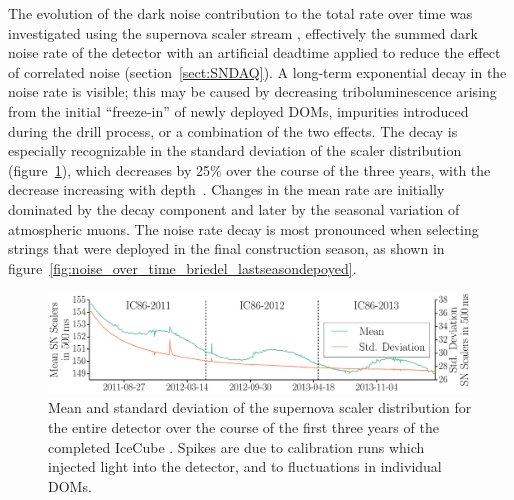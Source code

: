 The evolution of the dark noise contribution to the total rate over time was investigated using the
supernova scaler stream \cite{IC3:supernova, briedel_phd}, effectively 
the summed dark noise rate of the detector with an artificial deadtime
applied to reduce the effect of correlated noise
(section~\ref{sect:SNDAQ}). A long-term exponential decay in 
the noise rate is visible; this may be caused by 
decreasing triboluminescence \cite{ice_tribo} arising from the initial ``freeze-in''
of newly deployed DOMs, impurities introduced during the drill
process, or a combination of the two effects.  The decay
is especially recognizable in the standard deviation of the scaler
distribution (figure~\ref{fig:noise_over_time_briedel}), which decreases by
25\% over the course of the three years, with the decrease increasing with
depth~\cite{Piegsa09}. Changes in the mean rate are
initially dominated by the decay component and later by the seasonal
variation of atmospheric muons. The noise
rate decay is most pronounced when selecting strings
that were deployed in the final construction season, as shown in
figure~\ref{fig:noise_over_time_briedel_lastseasondepoyed}.


\begin{figure}[!h]
 \centering
 \includegraphics[width=1.0\textwidth]{graphics/dom/performance/darknoise/SN_Scalers_Whole_Detector_Mean_Variance_IC86_2011_2012_2013_smaller_height.pdf}
 \caption{Mean and standard deviation of the supernova scaler distribution for the
   entire detector over the course of the first three years of the
   completed IceCube \cite{briedel_phd}. Spikes are due to calibration
 runs which injected light into the detector, and to fluctuations in
 individual DOMs.} 
 \label{fig:noise_over_time_briedel}
\end{figure}

